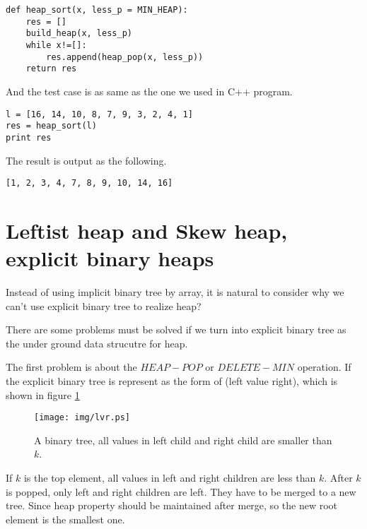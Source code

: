 \documentclass{article}
\begin{document}
\lstset{language=Python}
\begin{lstlisting}
def heap_sort(x, less_p = MIN_HEAP):
    res = []
    build_heap(x, less_p)
    while x!=[]:
        res.append(heap_pop(x, less_p))
    return res
\end{lstlisting}

And the test case is as same as the one we used in C++ program.

\begin{lstlisting}
l = [16, 14, 10, 8, 7, 9, 3, 2, 4, 1]
res = heap_sort(l)
print res
\end{lstlisting}

The result is output as the following.

\begin{verbatim}
[1, 2, 3, 4, 7, 8, 9, 10, 14, 16]
\end{verbatim}

\section{Leftist heap and Skew heap, explicit binary heaps}
\label{ebheap}

Instead of using implicit binary tree by array, it is natural to 
consider why we can't use explicit binary tree to realize heap?

There are some problems must be solved if we turn into explicit
binary tree as the under ground data strucutre for heap.

The first problem is about the $HEAP-POP$ or $DELETE-MIN$ operation.
If the explicit binary tree is represent as the form of 
(left value right), which is shown in figure \ref{fig:lvr}

\begin{figure}[htbp]
       \begin{center}
       	  \texttt{[image: img/lvr.ps]}
        \caption{A binary tree, all values in left child and right child are smaller than $k$.} \label{fig:lvr}
       \end{center}
\end{figure}

If $k$ is the top element, all values in left and right children are less
than $k$. After $k$ is popped, only left and right children are left.
They have to be merged to a new tree. Since heap property should be maintained
after merge, so the new root element is the smallest one.
\end{document}
